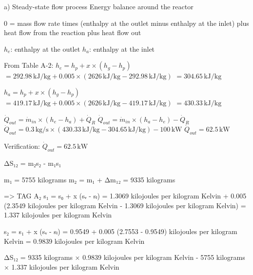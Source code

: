 a) Steady-state flow process  
Energy balance around the reactor  

0 = mass flow rate times (enthalpy at the outlet minus enthalpy at the inlet) plus heat flow from the reaction plus heat flow out  

\( h_e \): enthalpy at the outlet  
\( h_a \): enthalpy at the inlet  

From Table A-2:  
\( h_e = h_p + x \times (h_g - h_p) \)  
\( = 292.98 \, \text{kJ/kg} + 0.005 \times (2626 \, \text{kJ/kg} - 292.98 \, \text{kJ/kg}) \)  
\( = 304.65 \, \text{kJ/kg} \)  

\( h_a = h_p + x \times (h_g - h_p) \)  
\( = 419.17 \, \text{kJ/kg} + 0.005 \times (2626 \, \text{kJ/kg} - 419.17 \, \text{kJ/kg}) \)  
\( = 430.33 \, \text{kJ/kg} \)  

\( \dot{Q}_{out} = \dot{m}_{in} \times (h_e - h_a) + \dot{Q}_R \)  
\( \dot{Q}_{out} = \dot{m}_{in} \times (h_a - h_e) - \dot{Q}_R \)  
\( \dot{Q}_{out} = 0.3 \, \text{kg/s} \times (430.33 \, \text{kJ/kg} - 304.65 \, \text{kJ/kg}) - 100 \, \text{kW} \)  
\( \dot{Q}_{out} = 62.5 \, \text{kW} \)  

Verification:  
\( \dot{Q}_{out} = 62.5 \, \text{kW} \)

ΔS₁₂ = m₂s₂ - m₁s₁  

m₁ = 5755 kilograms  
m₂ = m₁ + Δm₁₂ = 9335 kilograms  

=> TAG A₂  
s₁ = s₀ + x (sᵥ - sₗ)  
= 1.3069 kilojoules per kilogram Kelvin + 0.005 (2.3549 kilojoules per kilogram Kelvin - 1.3069 kilojoules per kilogram Kelvin)  
= 1.337 kilojoules per kilogram Kelvin  

s₂ = s₁ + x (sᵥ - sₗ)  
= 0.9549 + 0.005 (2.7553 - 0.9549) kilojoules per kilogram Kelvin  
= 0.9839 kilojoules per kilogram Kelvin  

ΔS₁₂ = 9335 kilograms × 0.9839 kilojoules per kilogram Kelvin - 5755 kilograms × 1.337 kilojoules per kilogram Kelvin